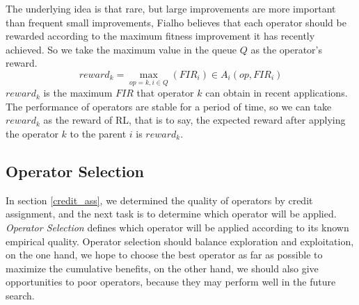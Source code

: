 \documentclass[journal]{IEEEtran}
\begin{document}
The underlying idea is that rare, but large improvements are more important than frequent small improvements, Fialho \cite{fialho2010comparison} believes that each operator should be rewarded according to the maximum fitness improvement it has recently achieved.
So we take the maximum value in the queue $Q$ as the operator's reward.
\begin{equation}
  reward_k = \max_{op=k, i\in Q}(FIR_i) \in A_i(op,FIR_i)
\end{equation}
$reward_k$ is the maximum $FIR$ that operator $k$ can obtain in recent applications.
The performance of operators are stable for a period of time, so we can take $reward_k$ as the reward of RL, that is to say, the expected reward after applying the operator $k$ to the parent $i$ is $reward_k$.


\subsection{Operator Selection \label{operator_selection}}
In section \ref{credit_ass}, we determined the quality of operators by credit assignment, and the next task is to determine which operator will be applied. \textit{Operator Selection} defines which operator will be applied according to its known empirical quality.
Operator selection should balance exploration and exploitation, on the one hand, we hope to choose the best operator as far as possible to maximize the cumulative benefits, on the other hand, we should also give opportunities to poor operators, because they may perform well in the future search.
\end{document}
